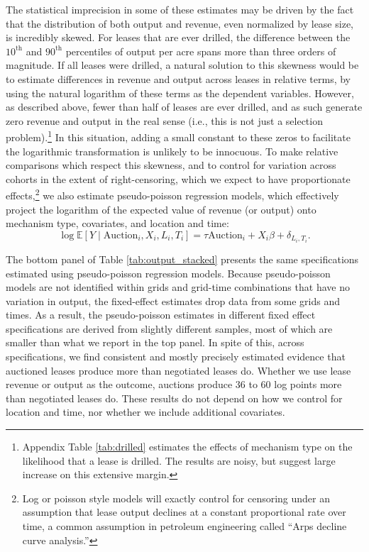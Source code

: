 \documentclass[12pt]{article}
\begin{document}
The statistical imprecision in some of these estimates may be driven by the fact that the distribution of both output and revenue, even normalized by lease size, is incredibly skewed. For leases that are ever drilled, the difference between the $10^{\text{th}}$ and $90^{\text{th}}$ percentiles of output per acre spans more than three orders of magnitude. If all leases were drilled, a natural solution to this skewness would be to estimate differences in revenue and output across leases in relative terms, by using the natural logarithm of these terms as the dependent variables. However, as described above, fewer than half of leases are ever drilled, and as such generate zero revenue and output in the real sense (i.e., this is not just a selection problem).\footnote{Appendix Table \ref{tab:drilled} estimates the effects of mechanism type on the likelihood that a lease is drilled. The results are noisy, but suggest large increase on this extensive margin.}  In this situation, adding a small constant to these zeros to facilitate the logarithmic transformation is unlikely to be innocuous.  To make relative comparisons which respect this skewness, and to control for variation across cohorts in the extent of right-censoring, which we expect to have proportionate effects,\footnote{Log or poisson style models will exactly control for censoring under an assumption that lease output declines at a constant proportional rate over time, a common assumption in petroleum engineering called ``Arps decline curve analysis.''} we also estimate pseudo-poisson regression models, which effectively project the logarithm of the expected value of revenue (or output) onto mechanism type, covariates, and location and time:
\begin{equation*}
 	\log \mathbb{E}\left[Y\mid \text{Auction}_i, X_i, L_i, T_i\right] = \tau \text{Auction}_i + X_i \beta + \delta_{L_i,T_i}. \label{eq:mainAuctionPoisson}
\end{equation*} 

The bottom panel of Table \ref{tab:output_stacked} presents the same specifications estimated using pseudo-poisson regression models.  Because pseudo-poisson models are not identified within grids and grid-time combinations that have no variation in output, the fixed-effect estimates drop data from some grids and times.  As a result, the pseudo-poisson estimates in different fixed effect specifications are derived from slightly different samples, most of which are smaller than what we report in the top panel.  In spite of this, across specifications, we find consistent and mostly precisely estimated evidence that auctioned leases produce more than negotiated leases do.  Whether we use lease revenue or output as the outcome, auctions produce 36 to 60 log points more than negotiated leases do.  These results do not depend on how we control for location and time, nor whether we include additional covariates.
\end{document}

